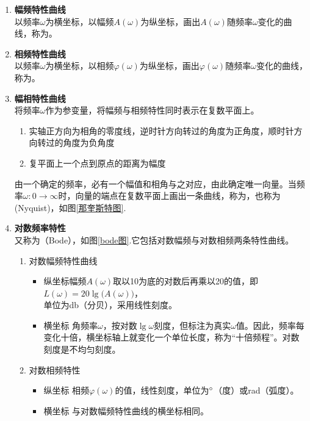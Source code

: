 \begin{enumerate}
	\item \textbf{幅频特性曲线}\\
	\hspace*{2em} 以频率$\omega$为横坐标，以幅频$A(\omega)$为纵坐标，画出$A(\omega )$随频率$\omega$变化的曲线，称为。
	
	\item \textbf{相频特性曲线}\\
	\hspace*{2em} 以频率$\omega$为横坐标，以相频$\varphi (\omega)$为纵坐标，画出$\varphi (\omega )$随频率$\omega$变化的曲线，称为。
	
	\item \textbf{幅相特性曲线}\\
	\hspace*{2em} 将频率$\omega$作为参变量，将幅频与相频特性同时表示在复数平面上。
	\begin{enumerate}[\hspace*{2em} $-$]
		\item 实轴正方向为相角的零度线，逆时针方向转过的角度为正角度，顺时针方向转过的角度为负角度
		\item 复平面上一个点到原点的距离为幅度
	\end{enumerate}
	由一个确定的频率，必有一个幅值和相角与之对应，由此确定唯一向量。当频率$\omega: 0 \to \infty$时，向量的端点在复数平面上画出一条曲线，称为，也称为(Nyquist)，如图\ref{那奎斯特图}.
	
	\item \textbf{对数频率特性}\\
	又称为（Bode），如图\ref{bode图}.它包括对数幅频与对数相频两条特性曲线。\vspace*{-0.5em}	
	\begin{enumerate}
		\item 对数幅频特性曲线
		\begin{itemize}
			\item 纵坐标\quad 幅频$A(\omega)$取以10为底的对数后再乘以20的值，即$L(\omega) = 20 \lg \big( A(\omega) \big)$，\\ 单位为db（分贝），采用线性刻度。
			\item 横坐标 \quad 角频率$\omega$，按对数$\lg \omega $刻度，但标注为真实$\omega$值。因此，频率每变化十倍，横坐标轴上就变化一个单位长度，称为“十倍频程”。对数刻度是不均匀刻度。
		\end{itemize}
		
		\item 对数相频特性
		\begin{itemize}
			\item 纵坐标 \quad 相频$\varphi(\omega)$的值，线性刻度，单位为${}^{\circ}$（度）或rad（弧度）。
			\item 横坐标 \quad 与对数幅频特性曲线的横坐标相同。
		\end{itemize}
	\end{enumerate}
\end{enumerate}
